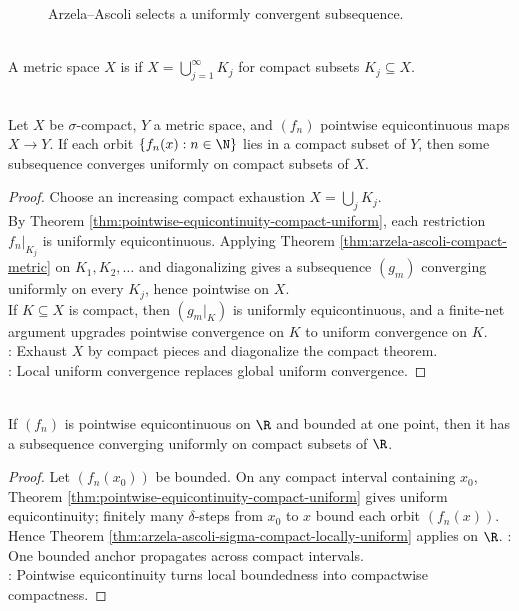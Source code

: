 \begin{figure}[H]
  \centering
  
  \caption{Arzela--Ascoli selects a uniformly convergent subsequence.}
  \label{fig:sequential-compactness-subsequence}
\end{figure}

\begin{definition} \label{def:sigma-compact-metric-space} \\
A metric space $X$ is  if $X=\bigcup\limits_{j=1}^{\infty}K_j$ for compact subsets $K_j\subseteq X$.
\end{definition}

\begin{theorem} \label{thm:arzela-ascoli-sigma-compact-locally-uniform} \\
Let $X$ be $\sigma$-compact, $Y$ a metric space, and $(f_n)$ pointwise equicontinuous maps $X\to Y$. If each orbit $\{f_n(x):n\in\N\}$ lies in a compact subset of $Y$, then some subsequence converges uniformly on compact subsets of $X$.
\begin{proof}
Choose an increasing compact exhaustion $X=\bigcup_jK_j$.\\
By Theorem \ref{thm:pointwise-equicontinuity-compact-uniform}, each restriction $f_n|_{K_j}$ is uniformly equicontinuous. Applying Theorem \ref{thm:arzela-ascoli-compact-metric} on $K_1,K_2,\ldots$ and diagonalizing gives a subsequence $(g_m)$ converging uniformly on every $K_j$, hence pointwise on $X$.\\
If $K\subseteq X$ is compact, then $(g_m|_K)$ is uniformly equicontinuous, and a finite-net argument upgrades pointwise convergence on $K$ to uniform convergence on $K$.\\
: Exhaust $X$ by compact pieces and diagonalize the compact theorem.\\
: Local uniform convergence replaces global uniform convergence.
\end{proof}
\end{theorem}

\begin{corollary} \label{cor:arzela-ascoli-real-line-locally-uniform} \\
If $(f_n)$ is pointwise equicontinuous on $\R$ and bounded at one point, then it has a subsequence converging uniformly on compact subsets of $\R$.
\begin{proof}
Let $(f_n(x_0))$ be bounded. On any compact interval containing $x_0$, Theorem \ref{thm:pointwise-equicontinuity-compact-uniform} gives uniform equicontinuity; finitely many $\delta$-steps from $x_0$ to $x$ bound each orbit $(f_n(x))$. Hence Theorem \ref{thm:arzela-ascoli-sigma-compact-locally-uniform} applies on $\R$.
: One bounded anchor propagates across compact intervals.\\
: Pointwise equicontinuity turns local boundedness into compactwise compactness.
\end{proof}
\end{corollary}

